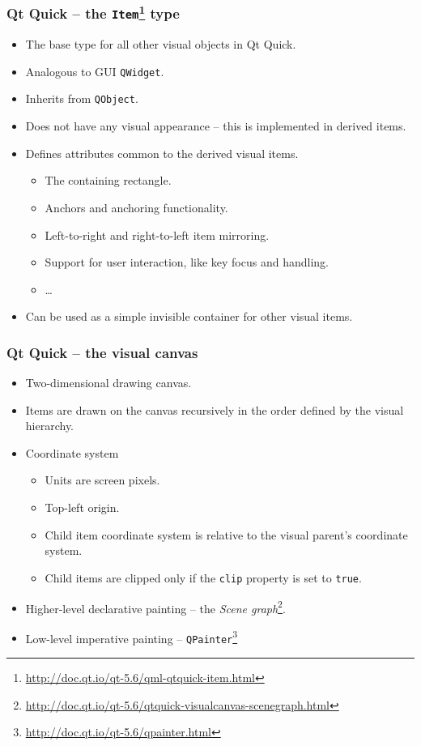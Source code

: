 \begin{frame}
  \frametitle{Qt Quick -- the \texttt{Item}\footnote
    {\url{http://doc.qt.io/qt-5.6/qml-qtquick-item.html}} type}
  \begin{itemize}
    \item The base type for all other visual objects in Qt Quick.
    \item Analogous to GUI \texttt{QWidget}.
    \item Inherits from \texttt{QObject}.
    \item Does not have any visual appearance -- this is implemented in derived
      items.
    \item Defines attributes common to the derived visual items.
    \begin{itemize}
      \small
      \item The containing rectangle.
      \item Anchors and anchoring functionality.
      \item Left-to-right and right-to-left item mirroring.
      \item Support for user interaction, like key focus and handling.
      \item \ldots
    \end{itemize}
    \item Can be used as a simple invisible container for other visual items.
  \end{itemize}
\end{frame}

\begin{frame}
  \frametitle{Qt Quick -- the visual canvas}
  \begin{itemize}
    \item Two-dimensional drawing canvas.
    \item Items are drawn on the canvas recursively in the order defined by
      the visual hierarchy.
    \item Coordinate system
    \begin{itemize}
      \small
      \item Units are screen pixels.
      \item Top-left origin.
      \item Child item coordinate system is relative to the visual parent's
        coordinate system.
      \item Child items are clipped only if the \texttt{clip} property is set
        to \texttt{true}.
    \end{itemize}
    \item Higher-level declarative painting -- the {\em Scene graph}\footnote
      {\url{http://doc.qt.io/qt-5.6/qtquick-visualcanvas-scenegraph.html}}.
    \item Low-level imperative painting -- \texttt{QPainter}\footnote
      {\url{http://doc.qt.io/qt-5.6/qpainter.html}}
  \end{itemize}
\end{frame}

